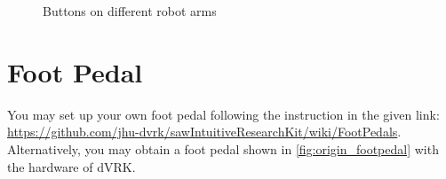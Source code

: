 \begin{figure}[H]
\centering
{}
\hfil
{}
\caption{Buttons on different robot arms}
\label{fig:arm_button}
\end{figure}

\section{Foot Pedal}

You may set up your own foot pedal following the instruction in the given link: \url{https://github.com/jhu-dvrk/sawIntuitiveResearchKit/wiki/FootPedals}. Alternatively, you may obtain a foot pedal shown in \autoref{fig:origin_footpedal} with the hardware of dVRK.

